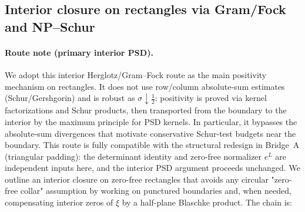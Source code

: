 \documentclass[11pt]{article}
\theoremstyle{definition}
\theoremstyle{remark}
\begin{document}
\subsection*{Interior closure on rectangles via Gram/Fock and NP--Schur}
\paragraph{Route note (primary interior PSD).}
We adopt this interior Herglotz/Gram--Fock route as the main positivity mechanism on rectangles. It does not use row/column absolute-sum estimates (Schur/Gershgorin) and is robust as $\sigma\downarrow\tfrac12$: positivity is proved via kernel factorizations and Schur products, then transported from the boundary to the interior by the maximum principle for PSD kernels. In particular, it bypasses the absolute-sum divergences that motivate conservative Schur-test budgets near the boundary. This route is fully compatible with the structural redesign in Bridge~A (triangular padding): the determinant identity and zero-free normalizer $e^{L}$ are independent inputs here, and the interior PSD argument proceeds unchanged.
We outline an interior closure on zero-free rectangles that avoids any circular "zero-free collar" assumption by working on punctured boundaries and, when needed, compensating interior zeros of \(\xi\) by a half-plane Blaschke product. The chain is:
\end{document}

